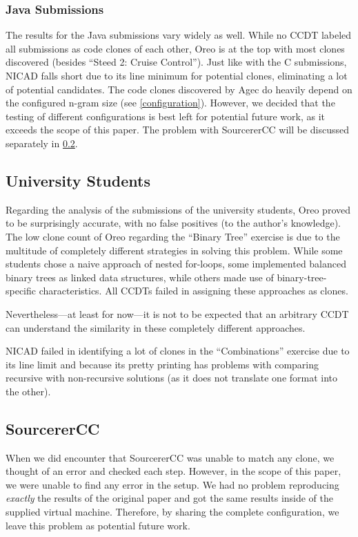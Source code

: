 \documentclass[10pt,journal,compsoc]{IEEEtran}
\def\todo#1{\textcolor{brown!80!yellow!70!black!90!red}{[\textsc{todo}: \textsf{#1}]}}
\begin{document}
\subsubsection{Java Submissions}
The results for the Java submissions vary widely as well. While no CCDT labeled all submissions as code clones of each other, Oreo is at the top with most clones discovered (besides \enquote{Steed 2: Cruise Control}).
Just like with the C submissions, NICAD falls short due to its line minimum for potential clones, eliminating a lot of potential candidates.
The code clones discovered by Agec do heavily depend on the configured n-gram size (see \cref{configuration}).
However, we decided that the testing of different configurations is best left for potential future work, as it exceeds the scope of this paper.
The problem with SourcererCC will be discussed separately in \cref{problem:SourcererCC}.

\subsection{University Students}
Regarding the analysis of the submissions of the university students, Oreo proved to be surprisingly accurate, with no false positives (to the author's knowledge).
The low clone count of Oreo regarding the \enquote{Binary Tree} exercise is due to the multitude of completely different strategies in solving this problem.
While some students chose a naive approach of nested for-loops, some implemented balanced binary trees as linked data structures, while others made use of binary-tree-specific characteristics.
All CCDTs failed in assigning these approaches as clones.

Nevertheless---at least for now---it is not to be expected that an arbitrary CCDT can understand the similarity in these completely different approaches.

NICAD failed in identifying a lot of clones in the \enquote{Combinations} exercise due to its line limit and because its pretty printing has problems with comparing recursive with non-recursive solutions (as it does not translate one format into the other).

\subsection{SourcererCC}\label{problem:SourcererCC}
When we did encounter that SourcererCC was unable to match any clone, we thought of an error and checked each step. However, in the scope of this paper, we were unable to find any error in the setup.
We had no problem reproducing \textit{exactly} the results of the original paper and got the same results inside of the supplied virtual machine.
Therefore, by sharing the complete configuration, we leave this problem as potential future work.
\end{document}
